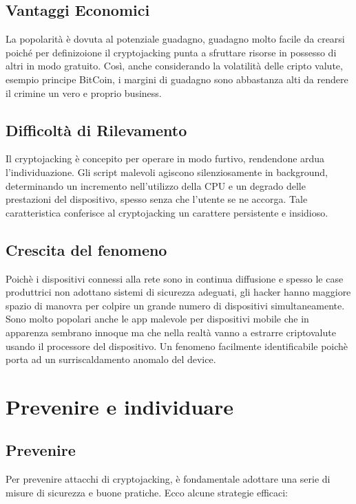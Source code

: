 \documentclass[12pt,a4paper]{article}
\begin{document}
\subsection{Vantaggi Economici}
La popolarità è dovuta al potenziale guadagno, guadagno molto facile da crearsi
poiché per definizoione il cryptojacking punta a sfruttare risorse in possesso
di altri in modo gratuito. Così, anche considerando la volatilità delle cripto
valute, esempio principe BitCoin, i margini di guadagno sono abbastanza alti da
rendere il crimine un vero e proprio business. 

\subsection{Difficoltà di Rilevamento}
Il cryptojacking è concepito per operare in modo furtivo, rendendone ardua
l'individuazione. Gli script malevoli agiscono silenziosamente in background,
determinando un incremento nell'utilizzo della CPU e un degrado delle
prestazioni del dispositivo, spesso senza che l'utente se ne accorga. Tale
caratteristica conferisce al cryptojacking un carattere persistente e insidioso.

\subsection{Crescita del fenomeno}
Poichè i dispositivi connessi alla rete sono in continua diffusione e spesso le
case produttrici non adottano sistemi di sicurezza adeguati, gli hacker hanno
maggiore spazio di manovra per colpire un grande numero di dispositivi
simultaneamente. Sono molto popolari anche le app malevole per dispositivi
mobile che in apparenza sembrano innoque ma che nella realtà vanno a estrarre
criptovalute usando il processore del dispositivo. Un fenomeno facilmente
identificabile poichè porta ad un surriscaldamento anomalo del device.

\newpage

\section{Prevenire e individuare}

\subsection{Prevenire}
Per prevenire attacchi di cryptojacking, è fondamentale adottare una serie di
misure di sicurezza e buone pratiche. Ecco alcune strategie efficaci:
\end{document}
